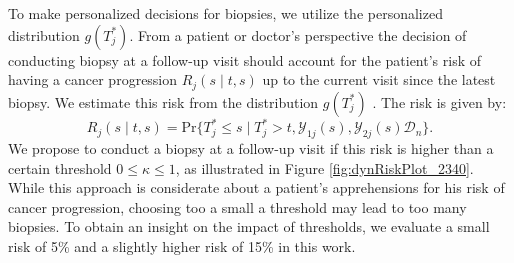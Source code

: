 To make personalized decisions for biopsies, we utilize the personalized distribution $g(T^*_j)$.
From a patient or doctor's perspective the decision of conducting biopsy at a follow-up visit should account for the patient's risk of having a cancer progression $R_j(s \mid t, s)$ up to the current visit since the latest biopsy. We estimate this risk from the distribution $g(T^*_j)$ \cite{rizopoulos2011dynamic}. The risk is given by:
\begin{equation*}
\label{eq:dynamic_risk_prob}
R_j(s \mid t, s) = \mbox{Pr}\big\{T^*_j \leq s \mid T^*_j > t, \mathcal{Y}_{1j}(s), \mathcal{Y}_{2j}(s) \mathcal{D}_n\big\}.
\end{equation*}
We propose to conduct a biopsy at a follow-up visit if this risk is higher than a certain threshold $0 \leq \kappa \leq 1$, as illustrated in Figure \ref{fig:dynRiskPlot_2340}. While this approach is considerate about a patient's apprehensions for his risk of cancer progression, choosing too a small a threshold may lead to too many biopsies. To obtain an insight on the impact of thresholds, we evaluate a small risk of 5\% and a slightly higher risk of 15\% in this work.
